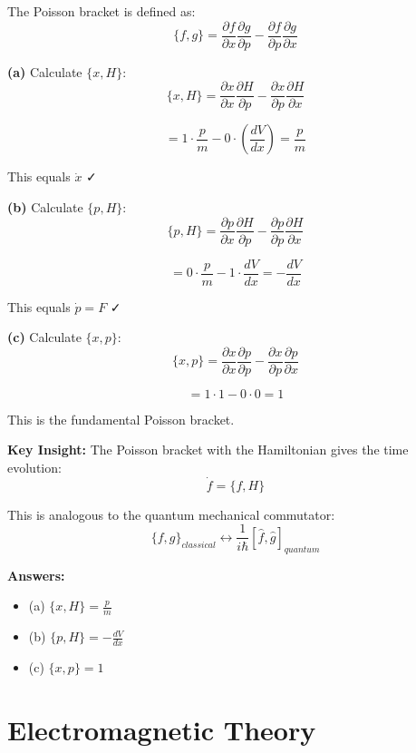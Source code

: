 \documentclass[12pt,a4paper]{article}
\begin{document}
\begin{solution}
The Poisson bracket is defined as:
$$\{f, g\} = \frac{\partial f}{\partial x}\frac{\partial g}{\partial p} - \frac{\partial f}{\partial p}\frac{\partial g}{\partial x}$$

\textbf{(a)} Calculate $\{x, H\}$:
$$\{x, H\} = \frac{\partial x}{\partial x}\frac{\partial H}{\partial p} - \frac{\partial x}{\partial p}\frac{\partial H}{\partial x}$$

$$= 1 \cdot \frac{p}{m} - 0 \cdot \left(\frac{dV}{dx}\right) = \frac{p}{m}$$

This equals $\dot{x}$ ✓

\textbf{(b)} Calculate $\{p, H\}$:
$$\{p, H\} = \frac{\partial p}{\partial x}\frac{\partial H}{\partial p} - \frac{\partial p}{\partial p}\frac{\partial H}{\partial x}$$

$$= 0 \cdot \frac{p}{m} - 1 \cdot \frac{dV}{dx} = -\frac{dV}{dx}$$

This equals $\dot{p} = F$ ✓

\textbf{(c)} Calculate $\{x, p\}$:
$$\{x, p\} = \frac{\partial x}{\partial x}\frac{\partial p}{\partial p} - \frac{\partial x}{\partial p}\frac{\partial p}{\partial x}$$

$$= 1 \cdot 1 - 0 \cdot 0 = 1$$

This is the fundamental Poisson bracket.

\textbf{Key Insight:} The Poisson bracket with the Hamiltonian gives the time evolution:
$$\dot{f} = \{f, H\}$$

This is analogous to the quantum mechanical commutator:
$$\{f, g\}_{classical} \leftrightarrow \frac{1}{i\hbar}[\hat{f}, \hat{g}]_{quantum}$$

\textbf{Answers:}
\begin{itemize}
    \item (a) $\{x, H\} = \frac{p}{m}$
    \item (b) $\{p, H\} = -\frac{dV}{dx}$
    \item (c) $\{x, p\} = 1$
\end{itemize}
\end{solution}

\newpage


\section{Electromagnetic Theory}
\end{document}
